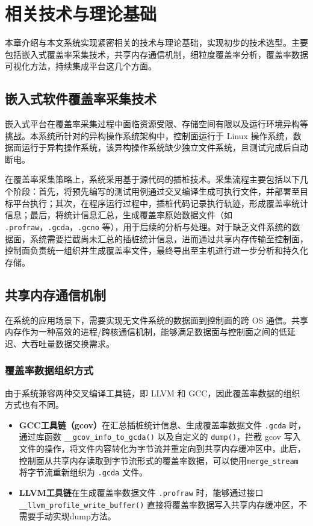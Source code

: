 
\chapter{相关技术与理论基础}
    本章介绍与本文系统实现紧密相关的技术与理论基础，实现初步的技术选型。主要包括嵌入式覆盖率采集技术，共享内存通信机制，细粒度覆盖率分析，覆盖率数据可视化方法，持续集成平台这几个方面。

\section{嵌入式软件覆盖率采集技术}
    嵌入式平台在覆盖率采集过程中面临资源受限、存储空间有限以及运行环境异构等挑战\cite{Weiss2024AchievingCS}。本系统所针对的异构操作系统架构中，控制面运行于 Linux 操作系统，数据面运行于异构操作系统，该异构操作系统缺少独立文件系统，且测试完成后自动断电。

    在覆盖率采集策略上，系统采用基于源代码的插桩技术\cite{source_based_code_coverage}\cite{gcc_manual}。采集流程主要包括以下几个阶段：首先，将预先编写的测试用例通过交叉编译生成可执行文件，并部署至目标平台执行；其次，在程序运行过程中，插桩代码记录执行轨迹，形成覆盖率统计信息；最后，将统计信息汇总，生成覆盖率原始数据文件（如 \verb|.profraw|，\verb|.gcda|，\verb|.gcno| 等），用于后续的分析与处理。对于缺乏文件系统的数据面，系统需要拦截尚未汇总的插桩统计信息\cite{source_based_code_coverage}\cite{coverage_in_freestanding_environments}，进而通过共享内存传输至控制面，控制面负责统一组织并生成覆盖率文件，最终导出至主机进行进一步分析和持久化存储。  

\section{共享内存通信机制}
    在系统的应用场景下，需要实现无文件系统的数据面到控制面的跨 OS 通信。共享内存作为一种高效的进程/跨核通信机制，能够满足数据面与控制面之间的低延迟、大吞吐量数据交换需求\cite{coppik_et_al:OASIcs.NG-RES.2025.2}\cite{江立2023共享内存在高效进程间通信中的应用研究}。

\subsection{覆盖率数据组织方式}
    由于系统兼容两种交叉编译工具链，即 LLVM 和 GCC，因此覆盖率数据的组织方式也有不同。
    \begin{itemize}
        \item \textbf{GCC工具链（gcov）}在汇总插桩统计信息、生成覆盖率数据文件 \verb|.gcda| 时，通过库函数 \verb|__gcov_info_to_gcda()| 以及自定义的 \verb|dump()|，拦截 gcov 写入文件的操作，将文件内容转化为字节流并重定向到共享内存缓冲区中，此后，控制面从共享内存读取到字节流形式的覆盖率数据，可以使用\verb|merge_stream| 将字节流重新组织为 \verb|.gcda| 文件\cite{gcc_manual}\cite{coverage_in_freestanding_environments}。
        \item \textbf{LLVM工具链}在生成覆盖率数据文件 \verb|.profraw| 时，能够通过接口 \verb|__llvm_profile_write_buffer()| 直接将覆盖率数据写入共享内存缓冲区，不需要手动实现dump方法\cite{source_based_code_coverage}。
    \end{itemize}

